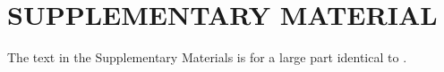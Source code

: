 \clearpage

\section{SUPPLEMENTARY MATERIAL}

The text in the Supplementary Materials is for a large part identical to \cite{renske_de_wit_2022_7113250}. 



\clearpage


\clearpage


\clearpage


\clearpage
% 

% 

% 

% 

% 

% 



